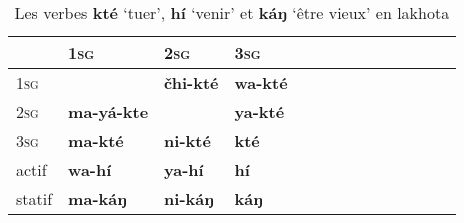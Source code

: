 \documentclass[oldfontcommands,twoside,a4paper,12pt]{article}
\newcommand{\ipa}[1]{{\phon\textbf{#1}}}
\newcommand{\grise}[1]{\cellcolor{lightgray}\textbf{#1}}
\begin{document}
\begin{table}[H]
\caption{Les verbes \ipa{kté} `tuer', \ipa{hí} `venir' et \ipa{káŋ} `être vieux' en lakhota} \centering
\begin{tabular}{l|lllllllllllll}
\toprule
&	\textsc{1sg }  &	 	\textsc{2sg }  &	 \textsc{3sg }    &	\\
	\midrule
\textsc{1sg }  &	\grise{} &	\ipa{čhi-kté} &		\ipa{wa-kté} &	 &	\\
\textsc{2sg }  &	\ipa{ma-yá-kte} &	\grise{} &		\ipa{ya-kté} &		\\
\textsc{3sg }  &	\ipa{ma-kté} &		\ipa{ni-kté} &		\ipa{kté} &		\\
	\midrule
actif & \ipa{wa-hí} &\ipa{ya-hí} & \ipa{hí} & \\
		\midrule
statif &  \ipa{ma-káŋ} &\ipa{ni-káŋ} & \ipa{káŋ} & \\
	\bottomrule
\end{tabular}
\end{table}
\end{document}
